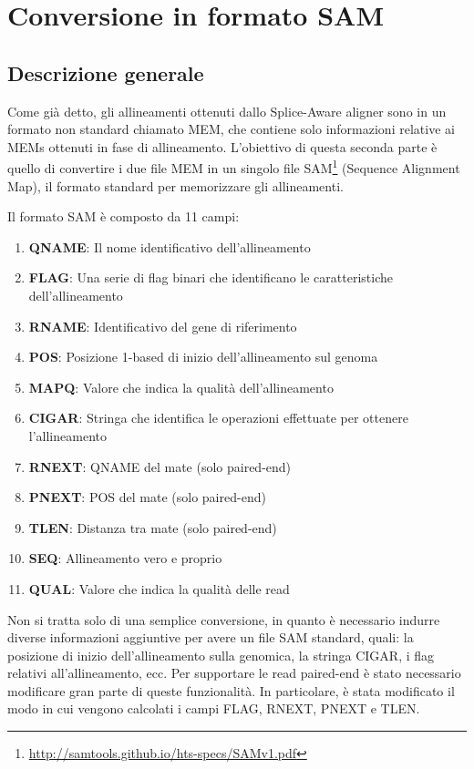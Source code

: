 \section{Conversione in formato SAM}

\subsection{Descrizione generale}
Come già detto, gli allineamenti ottenuti dallo Splice-Aware aligner sono in un formato non standard chiamato MEM, che contiene solo informazioni relative ai MEMs ottenuti in fase di allineamento. L'obiettivo di questa seconda parte è quello di convertire i due file MEM in un singolo file SAM\footnote{\url{http://samtools.github.io/hts-specs/SAMv1.pdf}} (Sequence Alignment Map), il formato standard per memorizzare gli allineamenti.

Il formato SAM è composto da 11 campi:

\begin{enumerate}
	\item \textbf{QNAME}: Il nome identificativo dell'allineamento
	\item \textbf{FLAG}: Una serie di flag binari che identificano le caratteristiche dell'allineamento
	\item \textbf{RNAME}: Identificativo del gene di riferimento
	\item \textbf{POS}: Posizione 1-based di inizio dell'allineamento sul genoma
	\item \textbf{MAPQ}:  Valore che indica la qualità dell'allineamento
	\item \textbf{CIGAR}: Stringa che identifica le operazioni effettuate per ottenere l'allineamento
	\item \textbf{RNEXT}: QNAME del mate (solo paired-end)
	\item \textbf{PNEXT}: POS del mate	(solo paired-end)
	\item \textbf{TLEN}:  Distanza tra mate (solo paired-end)
	\item \textbf{SEQ}:  	Allineamento vero e proprio
	\item \textbf{QUAL}: Valore che indica la qualità delle read
\end{enumerate}

Non si tratta solo di una semplice conversione, in quanto è necessario indurre diverse informazioni aggiuntive per avere un file SAM standard, quali: la posizione di inizio dell'allineamento sulla genomica, la stringa CIGAR, i flag relativi all'allineamento, ecc. Per supportare le read paired-end è stato necessario modificare gran parte di queste funzionalità. In particolare, è stata modificato il modo in cui vengono calcolati i campi FLAG, RNEXT, PNEXT e TLEN.

